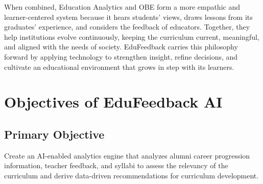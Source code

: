 When combined, Education Analytics and OBE form a more empathic and learner-centered system because it hears students' views, draws lessons from its graduates' experience, and considers the feedback of educators. Together, they help institutions evolve continuously, keeping the curriculum current, meaningful, and aligned with the needs of society. EduFeedback carries this philosophy forward by applying technology to strengthen insight, refine decisions, and cultivate an educational environment that grows in step with its learners.


\section{Objectives of EduFeedback AI}

\subsection{Primary Objective}
Create an AI-enabled analytics engine that analyzes alumni career progression information, teacher feedback, and syllabi to assess the relevancy of the curriculum and derive data-driven recommendations for curriculum development.

